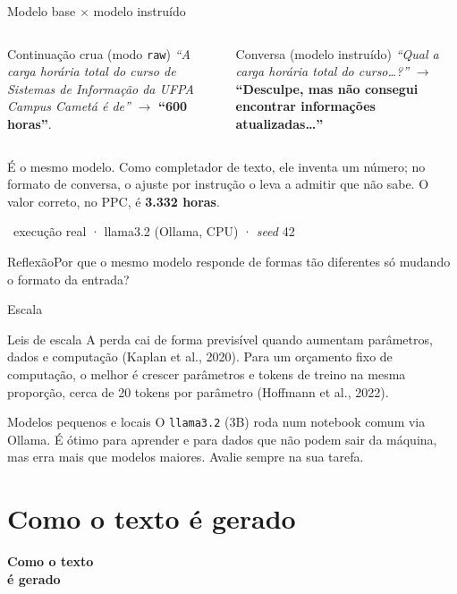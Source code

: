 \documentclass[aspectratio=169]{beamer}
\newcommand{\reflexao}[1]{\begin{alertblock}{Reflexão}#1\end{alertblock}}
\newcommand{\real}{\textcolor{minegreen}{\tiny\faIcon{flask}\ execução real · llama3.2 (Ollama, CPU) · \textit{seed} 42}}
\begin{document}
\begin{frame}{Modelo base $\times$ modelo instruído}
    \begin{columns}
        \begin{block}{Continuação crua (modo \texttt{raw})}
            \footnotesize \textit{``A carga horária total do curso de Sistemas de Informação da UFPA Campus Cametá é de''} $\to$ \textbf{``600 horas''}.
        \end{block}
        \begin{block}{Conversa (modelo instruído)}
            \footnotesize \textit{``Qual a carga horária total do curso\dots?''} $\to$ \textbf{``Desculpe, mas não consegui encontrar informações atualizadas\dots''}
        \end{block}
    \end{columns}
    \pause
    \begin{alertblock}{}
        \footnotesize É o mesmo modelo. Como completador de texto, ele inventa um número; no formato de conversa, o ajuste por instrução o leva a admitir que não sabe. O valor correto, no PPC, é \textbf{3.332 horas}.
    \end{alertblock}
    \real
    \reflexao{Por que o mesmo modelo responde de formas tão diferentes só mudando o formato da entrada?}
\end{frame}

\begin{frame}{Escala}
    \begin{block}{Leis de escala}
        \footnotesize A perda cai de forma previsível quando aumentam parâmetros, dados e computação (Kaplan et al., 2020). Para um orçamento fixo de computação, o melhor é crescer parâmetros e tokens de treino na mesma proporção, cerca de 20 tokens por parâmetro (Hoffmann et al., 2022).
    \end{block}
    \pause
    \begin{block}{Modelos pequenos e locais}
        \footnotesize O \texttt{llama3.2} (3B) roda num notebook comum via Ollama. É ótimo para aprender e para dados que não podem sair da máquina, mas erra mais que modelos maiores. Avalie sempre na sua tarefa.
    \end{block}
\end{frame}

\section{Como o texto é gerado}
\begin{frame}
\centering\Huge\textbf{Como o texto\\é gerado}
\end{frame}
\end{document}
